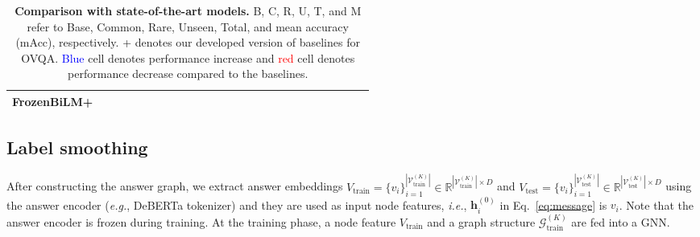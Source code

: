 \documentclass[10pt,twocolumn,letterpaper]{article}
\begin{document}
\begin{table*}[t!]
\begin{adjustbox}{width=\linewidth}
\begin{tabular}{c|c c c c c c | c c c c c c | c c c c c c | c c c c c c }
        \textbf{FrozenBiLM+}  & \cellcolor[HTML]{FFD7D1}{72.2} & \cellcolor[HTML]{FFD7D1}{48.2} & \textbf{\cellcolor[HTML]{BFF2FF}{21.6}} & \textbf{\cellcolor[HTML]{BFF2FF}{16.1}} & \textbf{\cellcolor[HTML]{BFF2FF}{55.8}} & \textbf{\cellcolor[HTML]{BFF2FF}{21.7}} & \textbf{\cellcolor[HTML]{BFF2FF}{68.8}} & \cellcolor[HTML]{FFD7D1}{39.9} & \textbf{\cellcolor[HTML]{BFF2FF}{17.3}} & \textbf{\cellcolor[HTML]{BFF2FF}{5.8}} & \textbf{\cellcolor[HTML]{BFF2FF}{44.8}} & \textbf{\cellcolor[HTML]{BFF2FF}{12.4}} & \cellcolor[HTML]{FFD7D1}{77.7} & \textbf{\cellcolor[HTML]{BFF2FF}{52.1}} & \textbf{\cellcolor[HTML]{BFF2FF}{28.6}} & \textbf{\cellcolor[HTML]{BFF2FF}{21.3}} & \cellcolor[HTML]{BFF2FF}{69.0} & \textbf{\cellcolor[HTML]{BFF2FF}{30.2}} & \cellcolor[HTML]{FFD7D1}{56.1} & \textbf{\cellcolor[HTML]{BFF2FF}{26.6}} & \textbf{\cellcolor[HTML]{BFF2FF}{11.7}} & \textbf{\cellcolor[HTML]{BFF2FF}{6.6}} & \textbf{\cellcolor[HTML]{BFF2FF}{47.0}} & \textbf{\cellcolor[HTML]{BFF2FF}{12.4}} \\ 
        \bottomrule
    \end{tabular}
    \end{adjustbox}
    \caption{\textbf{Comparison with state-of-the-art models.}
    B, C, R, U, T, and M refer to Base, Common, Rare, Unseen, Total, and mean accuracy (mAcc), respectively.
    + denotes our developed version of baselines for OVQA.
    \textcolor{blue}{Blue} cell denotes performance increase and \textcolor{red}{red} cell denotes performance decrease compared to the baselines.
    }
    \label{tab:main}
\end{table*}

 \subsection{Label smoothing}

After constructing the answer graph, we extract answer embeddings $V_\text{train} = \{v_i\}_{i=1}^{|\mathcal{V}_\text{train}^{(K)}|}\in \mathbb{R}^{|\mathcal{V}_\text{train}^{(K)}| \times D}$ and $V_\text{test} = \{v_i\}_{i=1}^{|\mathcal{V}_\text{test}^{(K)}|} \in \mathbb{R}^{|\mathcal{V}_\text{test}^{(K)}| \times D}$ using the answer encoder (\textit{e.g.}, DeBERTa tokenizer) and they are used as input node features, \textit{i.e.}, $\mathbf{h}_i^{(0)}$ in Eq.~\eqref{eq:message} is $v_i$.
Note that the answer encoder is frozen during training.
At the training phase, a node feature $V_\text{train}$ and a graph structure $\mathcal{G}_\text{train}^{(K)}$ are fed into a GNN.
\end{document}
